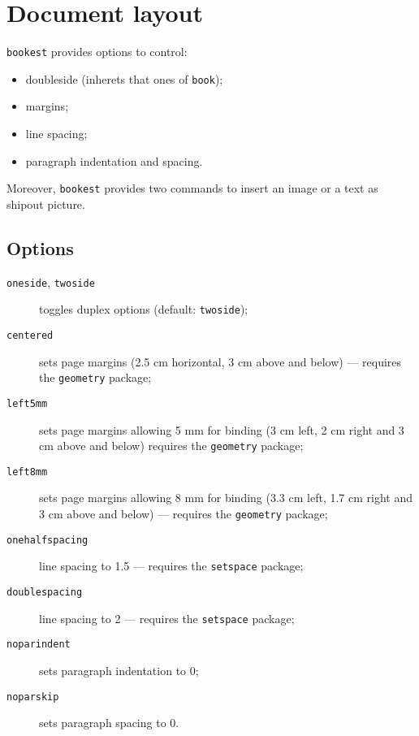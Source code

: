 \documentclass[a4paper,oneside,centered,noparindent,noparskip]{bookest}
\begin{document}
\section{Document layout}
\texttt{bookest} provides options to control:
\begin{itemize}
 \item doubleside (inherets that ones of \texttt{book});
 \item margins;
 \item line spacing;
 \item paragraph indentation and spacing.
\end{itemize}

Moreover, \texttt{bookest} provides two commands to insert an image or a text as shipout picture.

\subsection{Options}
\begin{description}
 \item[\texttt{oneside}, \texttt{twoside}] toggles duplex options (default: \texttt{twoside});
\end{description}
\ppar
\begin{description}
 \item[\texttt{centered}] sets page margins (2.5 cm horizontal, 3 cm above and below) --- requires the \texttt{geometry} package;
 \item[\texttt{left5mm}] sets page margins allowing 5 mm for binding (3 cm left, 2 cm right and 3 cm above and below) requires the \texttt{geometry} package;
 \item[\texttt{left8mm}] sets page margins allowing 8 mm for binding (3.3 cm left, 1.7 cm right and 3 cm above and below) --- requires the \texttt{geometry} package;
\end{description}
\ppar
\begin{description}
 \item[\texttt{onehalfspacing}] line spacing to 1.5 --- requires the \texttt{setspace} package;
 \item[\texttt{doublespacing}] line spacing to 2 --- requires the \texttt{setspace} package;
\end{description}
\ppar
\begin{description}
 \item[\texttt{noparindent}] sets paragraph indentation to 0;
 \item[\texttt{noparskip}] sets paragraph spacing to 0.
\end{description}
\end{document}
